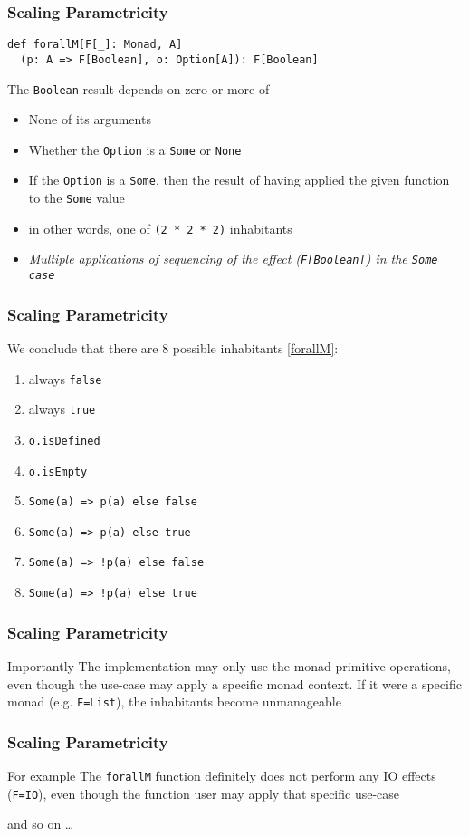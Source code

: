 \begin{frame}[fragile]
\frametitle{Scaling Parametricity}
\begin{lstlisting}[style=scala]
def forallM[F[_]: Monad, A]
  (p: A => F[Boolean], o: Option[A]): F[Boolean]
\end{lstlisting}
\begin{theorem}
  The \lstinline{Boolean} result depends on zero or more of
  \begin{itemize}
    \item None of its arguments
    \item Whether the \lstinline{Option} is a \lstinline{Some} or \lstinline{None}
    \item If the \lstinline{Option} is a \lstinline{Some}, then the result of having applied the given function to the \lstinline{Some} value
    \item in other words, one of \lstinline{(2 * 2 * 2)} inhabitants
    \item \emph{Multiple applications of sequencing of the effect (\lstinline{F[Boolean]}) in the \lstinline{Some case}}
  \end{itemize}
\end{theorem}
\end{frame}

\begin{frame}[fragile]
\frametitle{Scaling Parametricity}
  We conclude that there are 8 possible inhabitants \ref{forallM}:
  \begin{enumerate}
    \item always \lstinline{false}
    \item always \lstinline{true}
    \item \lstinline{o.isDefined}
    \item \lstinline{o.isEmpty}
    \item \lstinline{Some(a) => p(a) else false}
    \item \lstinline{Some(a) => p(a) else true}
    \item \lstinline{Some(a) => !p(a) else false}
    \item \lstinline{Some(a) => !p(a) else true}
  \end{enumerate}
\end{frame}

\begin{frame}[fragile]
\frametitle{Scaling Parametricity}
  \begin{block}{Importantly}
  The implementation may only use the monad primitive operations, even though the use-case may apply a specific monad context. If it were a specific monad (e.g. \lstinline{F=List}), the inhabitants become unmanageable
  \end{block}
\end{frame}

\begin{frame}[fragile]
\frametitle{Scaling Parametricity}
  \begin{block}{For example}
  The \lstinline{forallM} function definitely does not perform any IO effects (\lstinline{F=IO}), even though the function user may apply that specific use-case
  \end{block}
  and so on \ldots
\end{frame}
